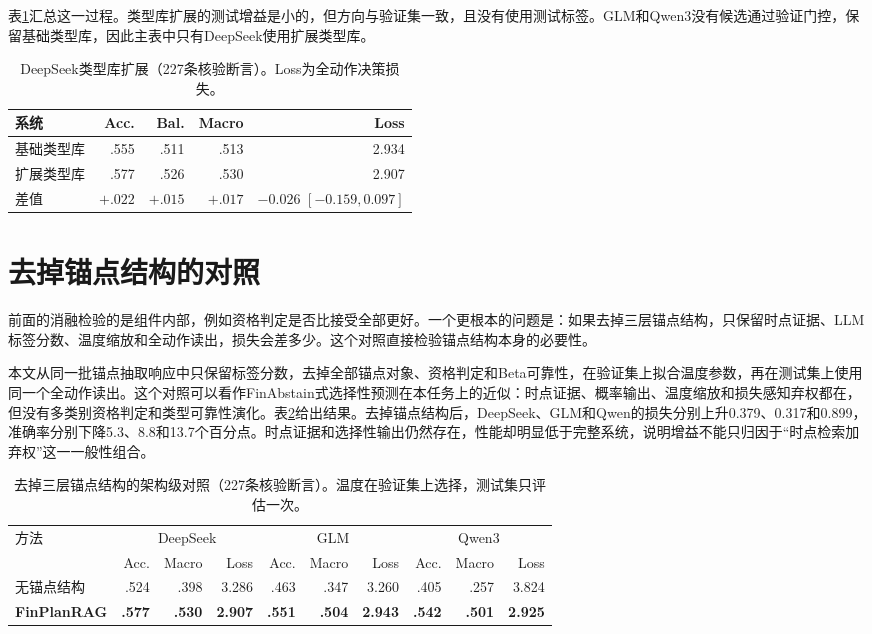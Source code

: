 表\ref{tab:typeevolve}汇总这一过程。类型库扩展的测试增益是小的，但方向与验证集一致，且没有使用测试标签。GLM和Qwen3没有候选通过验证门控，保留基础类型库，因此主表中只有DeepSeek使用扩展类型库。

\begin{table}[htbp]
\centering
{}
\setlength{\tabcolsep}{4pt}
\caption{DeepSeek类型库扩展（227条核验断言）。Loss为全动作决策损失。}
\label{tab:typeevolve}
\begin{tabular}{lrrrr}
\toprule
系统 & Acc. & Bal. & Macro & Loss \\
\midrule
基础类型库 & .555 & .511 & .513 & 2.934 \\
扩展类型库 & .577 & .526 & .530 & 2.907 \\
差值 & $+.022$ & $+.015$ & $+.017$ & $-0.026$ $[-0.159,0.097]$ \\
\bottomrule
\end{tabular}
\end{table}

\section{去掉锚点结构的对照}
\label{sec:no-anchor}

前面的消融检验的是组件内部，例如资格判定是否比接受全部更好。一个更根本的问题是：如果去掉三层锚点结构，只保留时点证据、LLM标签分数、温度缩放和全动作读出，损失会差多少。这个对照直接检验锚点结构本身的必要性。

本文从同一批锚点抽取响应中只保留标签分数，去掉全部锚点对象、资格判定和Beta可靠性，在验证集上拟合温度参数，再在测试集上使用同一个全动作读出。这个对照可以看作FinAbstain式选择性预测在本任务上的近似：时点证据、概率输出、温度缩放和损失感知弃权都在，但没有多类别资格判定和类型可靠性演化。表\ref{tab:noanchor}给出结果。去掉锚点结构后，DeepSeek、GLM和Qwen的损失分别上升0.379、0.317和0.899，准确率分别下降5.3、8.8和13.7个百分点。时点证据和选择性输出仍然存在，性能却明显低于完整系统，说明增益不能只归因于“时点检索加弃权”这一一般性组合。

\begin{table}[htbp]
\centering
{}
\setlength{\tabcolsep}{4pt}
\caption{去掉三层锚点结构的架构级对照（227条核验断言）。温度在验证集上选择，测试集只评估一次。}
\label{tab:noanchor}
\begin{tabular}{lrrrrrrrrr}
\toprule
\multirow{2}{*}{方法} & \multicolumn{3}{c}{DeepSeek} & \multicolumn{3}{c}{GLM} & \multicolumn{3}{c}{Qwen3} \\
\cmidrule(lr){2-4}\cmidrule(lr){5-7}\cmidrule(lr){8-10}
 & Acc. & Macro & Loss & Acc. & Macro & Loss & Acc. & Macro & Loss \\
\midrule
无锚点结构 & .524 & .398 & 3.286 & .463 & .347 & 3.260 & .405 & .257 & 3.824 \\
\textbf{FinPlanRAG} & \textbf{.577} & \textbf{.530} & \textbf{2.907} & \textbf{.551} & \textbf{.504} & \textbf{2.943} & \textbf{.542} & \textbf{.501} & \textbf{2.925} \\
\bottomrule
\end{tabular}
\end{table}

